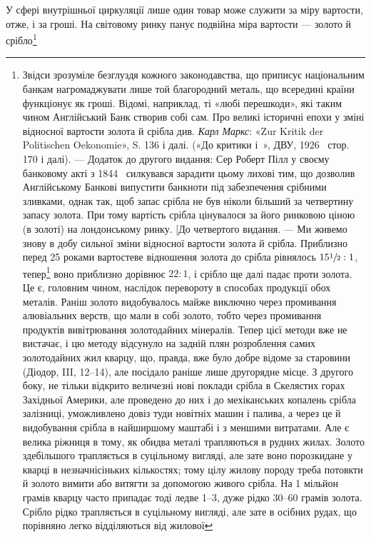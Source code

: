 У сфері внутрішньої циркуляції лише один товар може служити
за міру вартости, отже, і за гроші. На світовому ринку
панує подвійна міра вартости — золото й срібло\footnote{
Звідси зрозуміле безглуздя кожного законодавства, що приписує
національним банкам нагромаджувати лише той благородний металь,
що всередині країни функціонує як гроші. Відомі, наприклад, ті «любі
перешкоди», які таким чином Англійський Банк створив собі сам. Про
великі історичні епохи у зміні відносної вартости золота й срібла див.
\emph{Карл Маркс}: «Zur Kritik der Politischen Oekonomie», S. 136 і далі. («До
критики і~», ДВУ, 1926~ стор. 170 і далі). — Додаток до другого видання:
Сер Роберт Пілл у своєму банковому акті з 1844~ силкувався зарадити
цьому лихові тим, що дозволив Англійському Банкові випустити банкноти
під забезпечення срібними зливками, однак так, щоб запас срібла
не був ніколи більший за четвертину запасу золота. При тому вартість
срібла цінувалося за його ринковою ціною (в золоті) на лондонському
ринку. [До четвертого видання. — Ми живемо знову в добу сильної зміни
відносної вартости золота й срібла. Приблизно перед 25 роками вартостеве
відношення золота до срібла рівнялось $15\sfrac{1}{2} : 1$, тепер\footnote*{
1890~ — рік виготовлення 4 видання. \emph{Ред.}
} воно приблизно
дорівнює $22 : 1$, і срібло ще далі падає проти золота. Це є, головним чином,
наслідок перевороту в способах продукції обох металів. Раніш золото
видобувалось майже виключно через промивання алювіальних
верств, що мали в собі золото, тобто через промивання продуктів вивітрювання
золотодайних мінералів. Тепер цієї методи вже не вистачає,
і цю методу відсунуло на задній плян розроблення самих золотодайних
жил кварцу, що, правда, вже було добре відоме за старовини (Діодор, III,
12--14), але посідало раніше лише другорядне місце. З другого боку, не
тільки відкрито величезні нові поклади срібла в Скелястих горах Західньої
Америки, але проведено до них і до мехіканських копалень срібла
залізниці, уможливлено довіз туди новітніх машин і палива, а через це
й видобування срібла в найширшому маштабі і з меншими витратами.
Але є велика ріжниця в тому, як обидва металі трапляються в рудних
жилах. Золото здебільшого трапляється в суцільному вигляді, але зате воно
порозкидане у кварці в незначнісіньких кількостях; тому цілу жилову
породу треба потовкти й золото вимити або витягти за допомогою живого
срібла. На 1 мільйон грамів кварцу часто припадає тоді ледве 1--3,
дуже рідко 30--60 грамів золота. Срібло рідко трапляється в суцільному
вигляді, але зате в осібних рудах, що порівняно легко відділяються від жилової
}

